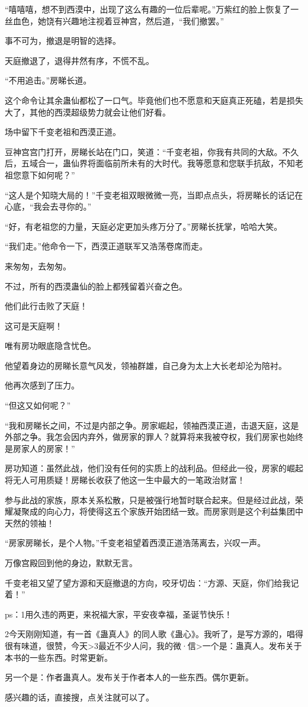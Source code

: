 \begin{this_body}
“嘻嘻嘻，想不到西漠中，出现了这么有趣的一位后辈呢。”万紫红的脸上恢复了一丝血色，她饶有兴趣地注视着豆神宫，然后道，“我们撤罢。”

事不可为，撤退是明智的选择。

天庭撤退了，退得井然有序，不慌不乱。

“不用追击。”房睇长道。

这个命令让其余蛊仙都松了一口气。毕竟他们也不愿意和天庭真正死磕，若是损失大了，其他的西漠超级势力就会让他们好看。

场中留下千变老祖和西漠正道。

豆神宫宫门打开，房睇长站在门口，笑道：“千变老祖，你我有共同的大敌。不久后，五域合一，蛊仙界将面临前所未有的大时代。我等愿意和您联手抗敌，不知老祖您意下如何呢？”

“这人是个知晓大局的！”千变老祖双眼微微一亮，当即点点头，将房睇长的话记在心底，“我会去寻你的。”

“好，有老祖您的力量，天庭必定更加头疼万分了。”房睇长抚掌，哈哈大笑。

“我们走。”他命令一下，西漠正道联军又浩荡卷席而走。

来匆匆，去匆匆。

不过，所有的西漠蛊仙的脸上都残留着兴奋之色。

他们此行击败了天庭！

这可是天庭啊！

唯有房功眼底隐含忧色。

他望着身边的房睇长意气风发，领袖群雄，自己身为太上大长老却沦为陪衬。

他再次感到了压力。

“但这又如何呢？”

“我和房睇长之间，不过是内部之争。房家崛起，领袖西漠正道，击退天庭，这是外部之争。我怎会因内弃外，做房家的罪人？就算将来我被夺权，我们房家也始终是房家人的房家！”

房功知道：虽然此战，他们没有任何的实质上的战利品。但经此一役，房家的崛起将无人可用质疑！房睇长收获了他这一生中最大的一笔政治财富！

参与此战的家族，原本关系松散，只是被强行地暂时联合起来。但是经过此战，荣耀凝聚成的向心力，将使得这五个家族开始团结一致。而房家则是这个利益集团中天然的领袖！

“房家房睇长，是个人物。”千变老祖望着西漠正道浩荡离去，兴叹一声。

万像宫殿回到他的身边，默默无言。

千变老祖又望了望方源和天庭撤退的方向，咬牙切齿：“方源、天庭，你们给我记着！”

ps：1用久违的两更，来祝福大家，平安夜幸福，圣诞节快乐！

2今天刚刚知道，有一首《蛊真人》的同人歌《蛊心》。我听了，是写方源的，唱得很有味道，很赞，今天>3最近不少人问，我的微·信>一个是：蛊真人。发布关于本书的一些东西。时常更新。

另一个是：作者蛊真人。发布关于作者本人的一些东西。偶尔更新。

感兴趣的话，直接搜，点关注就可以了。

\end{this_body}

